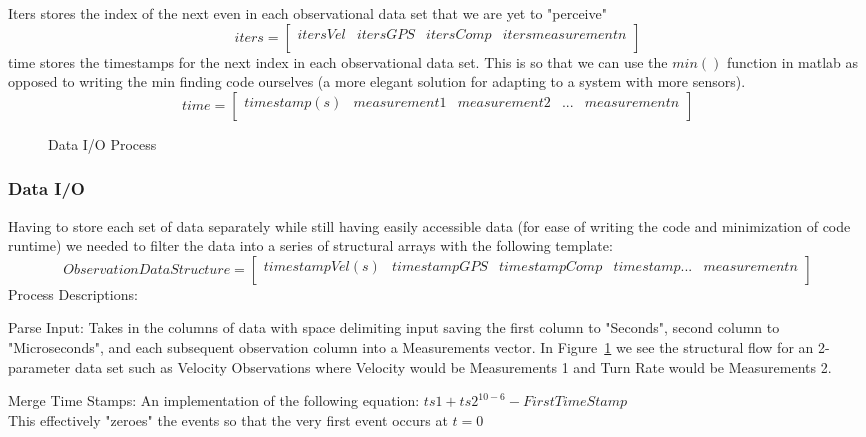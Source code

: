 		Iters stores the index of the next even in each observational data set that we are yet to "perceive"
		$$ iters =
		\begin{bmatrix}
		itersVel & itersGPS & itersComp & itersmeasurement n\\
		\end{bmatrix}
		$$
		time stores the timestamps for the next index in each observational data set. This is so that we can use the $min()$ function in matlab as opposed to writing the min finding code ourselves (a more elegant solution for adapting to a system with more sensors).
		$$time =
		\begin{bmatrix}
		timestamp (s) & measurement1 & measurement2 & ... & measurement n\\
		\end{bmatrix}
		$$
		\begin{figure}[position = here]
			\begin{centering}
				\begin{tikzpicture}[node distance = 1cm]
		
				\end{tikzpicture}
				\caption[\textit{A3}]{Data I/O Process\label{DIOP}}
			\end{centering}
		\end{figure}
		
		
		
		
		\pagebreak
		\subsubsection{Data I/O}
			Having to store each set of data separately while still having easily accessible data (for ease of writing the code and minimization of code runtime) we needed to filter the data into a series of structural arrays with the following template:
			$$Observation Data Structure =
			\begin{bmatrix}
			timestampVel (s) & timestampGPS & timestampComp & timestamp... & measurement n\\
			\end{bmatrix}
			$$
			Process Descriptions:
			\begin{list}{)~}{}
				\item Parse Input: Takes in the columns of data with space delimiting input saving the first column to "Seconds", second column to "Microseconds", and each subsequent observation column into a Measurements vector. In Figure~\ref{DIOP} we see the structural flow for an 2-parameter data set such as Velocity Observations where Velocity would be Measurements 1 and Turn Rate would be Measurements 2.
				\item Merge Time Stamps: An implementation of the following equation: $ts1+ts2^{10-6} - First Time Stamp$\\
				This effectively "zeroes" the events so that the very first event occurs at $t = 0$		
			\end{list}
			
